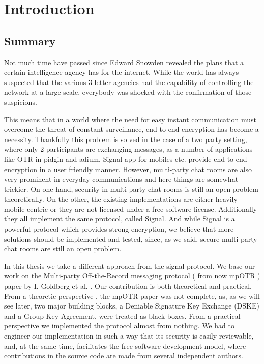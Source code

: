 \chapter{Introduction}

\label{chapter:introduction}

\newcommand{\dhname}{Diffie--Hellman}
\newcommand{\tdhname}{Triple Diffie--Hellman}



\section{Summary}

Not much time have passed since Edward Snowden revealed the plans that a certain intelligence agency has for the internet.
While the world has always suspected that the various 3 letter agencies had the capability of controlling the network at a large scale, everybody was shocked with the confirmation of those suspicions.

This means that in a world where the need for easy instant communication must overcome the threat of constant surveillance, end-to-end encryption has become a necessity.
Thankfully this problem is solved in the case of a two party setting, where only 2 participants are exchanging messages, as a number of applications like OTR in pidgin and adium, Signal app for mobiles etc. provide end-to-end encryption in a user friendly manner.
However, multi-party chat rooms are also very prominent in everyday communications and here things are somewhat trickier.
On one hand, security in multi-party chat rooms is still an open problem theoretically.
On the other, the existing implementations are either heavily mobile-centric or they are not licensed under a free software license.
Additionally they all implement the same protocol, called Signal.
And while Signal is a powerful protocol which provides strong encryption, we believe that more solutions should be implemented and tested, since, as we said, secure multi-party chat rooms are still an open problem.

In this thesis we take a different approach from the signal protocol.
We base our work on the Multi-party Off-the-Record messaging protocol ( from now mpOTR ) paper by I. Goldberg et al. \cite{mpotr}.
Our contribution is both theoretical and practical.
From a theoretic perspective , the mpOTR paper was not complete, as, as we will see later, two major building blocks, a Deniable Signature Key Exchange (DSKE) and a Group Key Agreement, were treated as black boxes.
From a practical perspective we implemented the protocol almost from nothing. We had to engineer our implementation in such a way that its security is easily reviewable, and, at the same time, facilitates the free software development model, where contributions in the source code are made from several independent authors.

